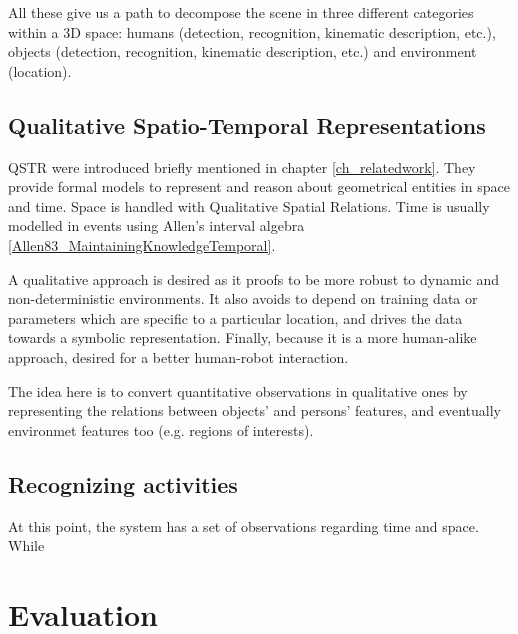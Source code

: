 All these give us a path to decompose the scene in three different categories within a 3D space: humans (detection, recognition, kinematic description, etc.), objects (detection, recognition, kinematic description, etc.) and environment (location).

\subsection{Qualitative Spatio-Temporal Representations}
QSTR were introduced briefly mentioned in chapter \ref{ch_relatedwork}.
They provide formal models to represent and reason about geometrical entities in space and time.
Space is handled with Qualitative Spatial Relations. %
Time is usually modelled in events using Allen's interval algebra \ref{Allen83_MaintainingKnowledgeTemporal}. %

A qualitative approach is desired as it proofs to be more robust to dynamic and non-deterministic environments.
It also avoids to depend on training data or parameters which are specific to a particular location, and drives the data towards a symbolic representation.
Finally, because it is a more human-alike approach, desired for a better human-robot interaction.

The idea here is to convert quantitative observations in qualitative ones by representing the relations between objects' and persons' features, and eventually environmet features too (e.g. regions of interests).


\subsection{Recognizing activities}
At this point, the system has a set of observations regarding time and space.
While












\section{Evaluation} %




